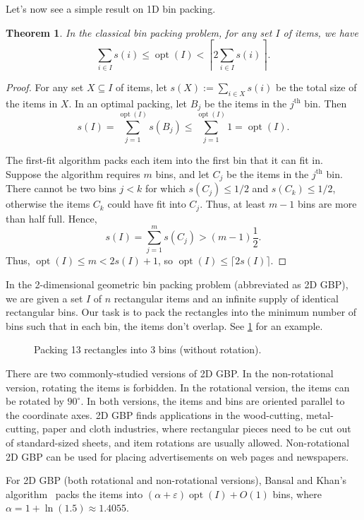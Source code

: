 \documentclass[a4paper,11pt,fleqn]{article}
\newtheorem{theorem}{Theorem}
\DeclareMathOperator{\opt}{opt}
\newcommand*{\Th}{^{\text{th}}}
\let\eps\varepsilon
\begin{document}
Let's now see a simple result on 1D bin packing.

\begin{tcolorbox}[colback=textColor!3!bgColor, colframe=textColor!40!bgColor, colupper=textColor]
\begin{theorem}
In the classical bin packing problem, for any set $I$ of items, we have
\[ \sum_{i \in I} s(i) \le \opt(I) < \left\lceil 2\sum_{i \in I} s(i) \right\rceil. \]
\end{theorem}
\end{tcolorbox}
\begin{proof}
For any set $X \subseteq I$ of items, let $s(X) := \sum_{i \in X} s(i)$
be the total size of the items in $X$.
In an optimal packing, let $B_j$ be the items in the $j\Th$ bin. Then
\[ s(I) = \sum_{j=1}^{\opt(I)} s(B_j) \le \sum_{j=1}^{\opt(I)} 1 = \opt(I). \]

The first-fit algorithm packs each item into the first bin that it can fit in.
Suppose the algorithm requires $m$ bins, and let $C_j$ be the items in the $j\Th$ bin.
There cannot be two bins $j < k$ for which $s(C_j) \le 1/2$ and $s(C_k) \le 1/2$,
otherwise the items $C_k$ could have fit into $C_j$.
Thus, at least $m-1$ bins are more than half full. Hence,
\[ s(I) = \sum_{j=1}^m s(C_j) > (m-1)\frac{1}{2}. \]
Thus, $\opt(I) \le m < 2s(I) + 1$, so $\opt(I) \le \lceil 2s(I) \rceil$.
\end{proof}

In the 2-dimensional geometric bin packing problem (abbreviated as 2D GBP),
we are given a set $I$ of $n$ rectangular items and an infinite supply
of identical rectangular bins.
Our task is to pack the rectangles into the minimum number of bins such that
in each bin, the items don't overlap.
See \cref{fig:2gbp} for an example.

\begin{figure}[htb]
\centering

\caption{Packing 13 rectangles into 3 bins (without rotation).}
\label{fig:2gbp}
\end{figure}

There are two commonly-studied versions of 2D GBP.
In the non-rotational version, rotating the items is forbidden.
In the rotational version, the items can be rotated by $90^{\circ}$.
In both versions, the items and bins are oriented parallel to the coordinate axes.
%
2D GBP finds applications in the wood-cutting, metal-cutting, paper and cloth industries,
where rectangular pieces need to be cut out of standard-sized sheets,
and item rotations are usually allowed.
Non-rotational 2D GBP can be used for placing advertisements on web pages and newspapers.

For 2D GBP (both rotational and non-rotational versions),
Bansal and Khan's algorithm~\cite{bansal2014binpacking}
packs the items into $(\alpha+\eps)\opt(I)+O(1)$ bins, where
$\alpha = 1 + \ln(1.5) \approx 1.4055$.

\small


\end{document}
